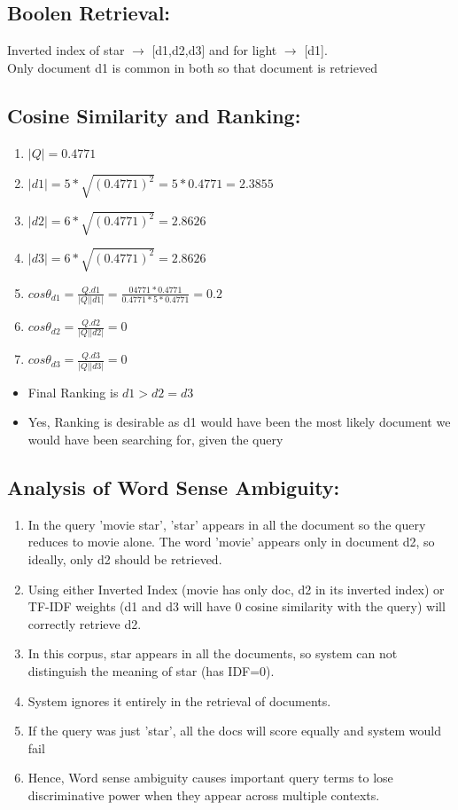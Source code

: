 \documentclass{article}
\begin{document}
\subsection{Boolen Retrieval:}
Inverted index of star $\rightarrow$ [d1,d2,d3] and for light $\rightarrow$ [d1]. \\
Only document d1 is common in both so that document is retrieved
\subsection{Cosine Similarity and Ranking:}
\begin{enumerate}
    \item $|Q|=0.4771$
    \item $|d1|=5*\sqrt{(0.4771)^2}=5*0.4771=2.3855$
    \item $|d2|=6*\sqrt{(0.4771)^2}=2.8626$
    \item $|d3|=6*\sqrt{(0.4771)^2}=2.8626$
    \item $cos\theta_{d1}=\frac{Q.d1}{|Q||d1|}=\frac{04771*0.4771}{0.4771*5*0.4771}=0.2$
    \item $cos\theta_{d2}=\frac{Q.d2}{|Q||d2|}=0$
    \item $cos\theta_{d3}=\frac{Q.d3}{|Q||d3|}=0$
\end{enumerate}
\begin{itemize}
    \item Final Ranking is $d1>d2=d3$
    \item Yes, Ranking is desirable as d1 would have been the most likely document we would have been searching for, given the query
\end{itemize}
\subsection{Analysis of Word Sense Ambiguity:}
\begin{enumerate}
    \item In the query 'movie star', 'star' appears in all the document so the query reduces to movie alone. The word 'movie' appears only in document d2, so ideally, only d2 should be retrieved.
    \item Using either Inverted Index (movie has only doc, d2 in its inverted index) or TF-IDF weights (d1 and d3 will have 0 cosine similarity with the query) will correctly retrieve d2.
    \item In this corpus, star appears in all the documents, so system can not distinguish the meaning of star (has IDF=0).
    \item System ignores it entirely in the retrieval of documents.
    \item If the query was just 'star', all the docs will score equally and system would fail
    \item Hence, Word sense ambiguity causes important query terms to lose discriminative power when they appear across multiple contexts.
\end{enumerate}
\end{document}
